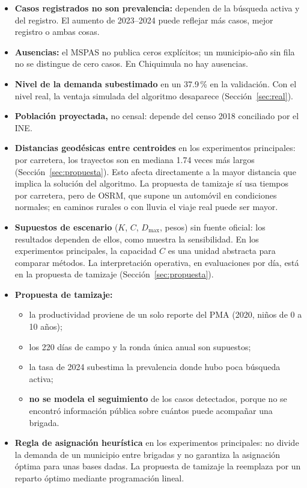 \documentclass[11pt,letterpaper]{article}
\begin{document}
\begin{itemize}
  \item \textbf{Casos registrados no son prevalencia:} dependen de la búsqueda activa y del registro. El aumento de 2023--2024 puede reflejar más casos, mejor registro o ambas cosas.
  \item \textbf{Ausencias:} el MSPAS no publica ceros explícitos; un municipio-año sin fila no se distingue de cero casos. En Chiquimula no hay ausencias.
  \item \textbf{Nivel de la demanda subestimado} en un 37.9\,\% en la validación. Con el nivel real, la ventaja simulada del algoritmo desaparece (Sección~\ref{sec:real}).
  \item \textbf{Población proyectada,} no censal: depende del censo 2018 conciliado por el INE.
  \item \textbf{Distancias geodésicas entre centroides} en los experimentos principales: por carretera, los trayectos son en mediana 1.74 veces más largos (Sección~\ref{sec:propuesta}). Esto afecta directamente a la mayor distancia que implica la solución del algoritmo. La propuesta de tamizaje sí usa tiempos por carretera, pero de OSRM, que supone un automóvil en condiciones normales; en caminos rurales o con lluvia el viaje real puede ser mayor.
  \item \textbf{Supuestos de escenario} ($K$, $C$, $D_{\max}$, pesos) sin fuente oficial: los resultados dependen de ellos, como muestra la sensibilidad. En los experimentos principales, la capacidad $C$ es una unidad abstracta para comparar métodos. La interpretación operativa, en evaluaciones por día, está en la propuesta de tamizaje (Sección~\ref{sec:propuesta}).
  \item \textbf{Propuesta de tamizaje:}
    \begin{itemize}[nosep]
      \item la productividad proviene de un solo reporte del PMA (2020, niños de 0 a 10 años);
      \item los 220 días de campo y la ronda única anual son supuestos;
      \item la tasa de 2024 subestima la prevalencia donde hubo poca búsqueda activa;
      \item \textbf{no se modela el seguimiento} de los casos detectados, porque no se encontró información pública sobre cuántos puede acompañar una brigada.
    \end{itemize}
  \item \textbf{Regla de asignación heurística} en los experimentos principales: no divide la demanda de un municipio entre brigadas y no garantiza la asignación óptima para unas bases dadas. La propuesta de tamizaje la reemplaza por un reparto óptimo mediante programación lineal.

\end{itemize}
\end{document}

